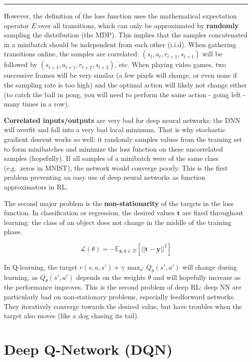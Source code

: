 \documentclass[
  letterpaper,
  DIV=11,
  numbers=noendperiod]{scrreprt}
\begin{document}
\begin{center}\rule{0.5\linewidth}{0.5pt}\end{center}

However, the definition of the loss function uses the mathematical
expectation operator \(E\) over all transitions, which can only be
approximated by \textbf{randomly} sampling the distribution (the MDP).
This implies that the samples concatenated in a minibatch should be
independent from each other (i.i.d). When gathering transitions online,
the samples are correlated: \((s_t, a_t, r_{t+1}, s_{t+1})\) will be
followed by \((s_{t+1}, a_{t+1}, r_{t+2}, s_{t+2})\), etc. When playing
video games, two successive frames will be very similar (a few pixels
will change, or even none if the sampling rate is too high) and the
optimal action will likely not change either (to catch the ball in pong,
you will need to perform the same action - going left - many times in a
row).

\textbf{Correlated inputs/outputs} are very bad for deep neural
networks: the DNN will overfit and fall into a very bad local minimum.
That is why stochastic gradient descent works so well: it randomly
samples values from the training set to form minibatches and minimize
the loss function on these uncorrelated samples (hopefully). If all
samples of a minibatch were of the same class (e.g.~zeros in MNIST), the
network would converge poorly. This is the first problem preventing an
easy use of deep neural networks as function approximators in RL.

The second major problem is the \textbf{non-stationarity} of the targets
in the loss function. In classification or regression, the desired
values \(\mathbf{t}\) are fixed throughout learning: the class of an
object does not change in the middle of the training phase.

\[
    \mathcal{L}(\theta) = - \mathbb{E}_{\mathbf{x}, \mathbf{t} \in \mathcal{D}}[ ||\mathbf{t} - \mathbf{y}||^2]
\]

In Q-learning, the target
\(r(s, a, s') + \gamma \, \max_{a'} Q_\theta(s', a')\) will change
during learning, as \(Q_\theta(s', a')\) depends on the weights
\(\theta\) and will hopefully increase as the performance improves. This
is the second problem of deep RL: deep NN are particularly bad on
non-stationary problems, especially feedforward networks. They
iteratively converge towards the desired value, but have troubles when
the target also moves (like a dog chasing its tail).

\hypertarget{deep-q-network-dqn}{%
\section{Deep Q-Network (DQN)}\label{deep-q-network-dqn}}
\end{document}
